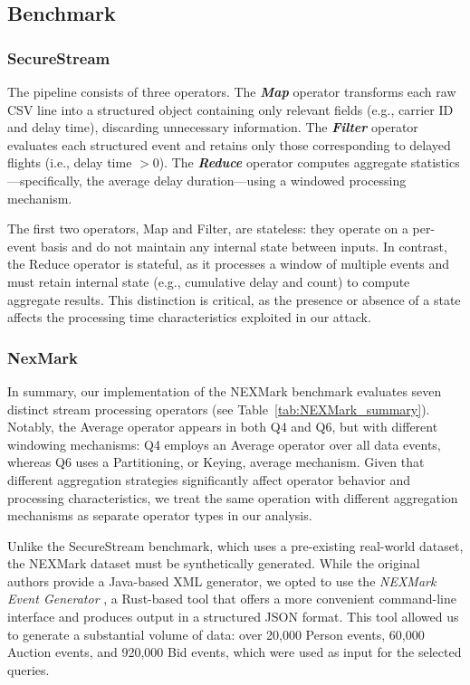 \begin{appendices}

\section{Benchmark}
\label{app:benchmark}
\subsubsection*{SecureStream}
The pipeline consists of three operators. The \textbf{\textit{Map}} operator transforms each raw CSV line into a structured object containing only relevant fields (e.g., carrier ID and delay time), discarding unnecessary information. The \textbf{\textit{Filter}} operator evaluates each structured event and retains only those corresponding to delayed flights (i.e., delay time $>0$). The \textbf{\textit{Reduce}} operator computes aggregate statistics—specifically, the average delay duration—using a windowed processing mechanism.

The first two operators, Map and Filter, are stateless: they operate on a per-event basis and do not maintain any internal state between inputs. In contrast, the Reduce operator is stateful, as it processes a window of multiple events and must retain internal state (e.g., cumulative delay and count) to compute aggregate results. This distinction is critical, as the presence or absence of a state affects the processing time characteristics exploited in our attack.

\subsubsection*{NexMark}

In summary, our implementation of the NEXMark benchmark evaluates seven distinct stream processing operators (see Table~\ref{tab:NEXMark_summary}). Notably, the Average operator appears in both Q4 and Q6, but with different windowing mechanisms: Q4 employs an Average operator over all data events, whereas Q6 uses a Partitioning, or Keying, average mechanism. Given that different aggregation strategies significantly affect operator behavior and processing characteristics, we treat the same operation with different aggregation mechanisms as separate operator types in our analysis.

Unlike the SecureStream benchmark, which uses a pre-existing real-world dataset, the NEXMark dataset must be synthetically generated. While the original authors provide a Java-based XML generator, we opted to use the \textit{NEXMark Event Generator} \cite{nexmark_data_generator}, a Rust-based tool that offers a more convenient command-line interface and produces output in a structured JSON format. This tool allowed us to generate a substantial volume of data: over 20,000 Person events, 60,000 Auction events, and 920,000 Bid events, which were used as input for the selected queries.


\end{appendices}
